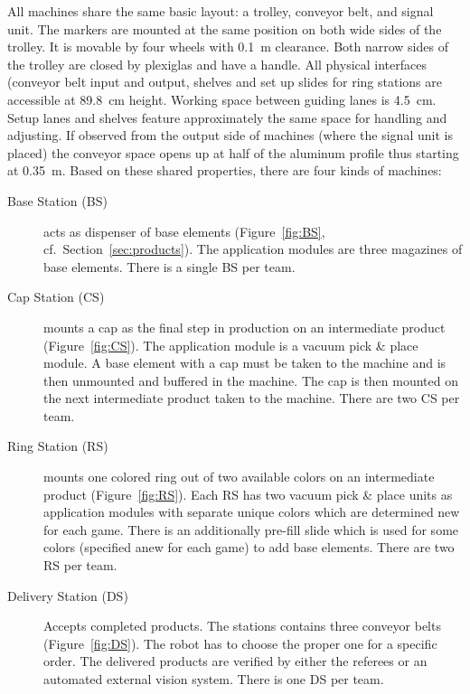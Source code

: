 \documentclass[12pt,twoside]{article}
\newcommand{\refsec}[1]{Section~\ref{#1}}
\newcommand{\reffig}[1]{Figure~\ref{#1}}
\begin{document}
All machines share the same basic layout: a trolley, conveyor belt,
and signal unit. The markers are mounted at the same position on both
wide sides of the trolley. It is movable by four wheels with
\SI{0.1}{\metre} clearance. Both narrow sides of the trolley are
closed by plexiglas and have a handle. All physical interfaces
(conveyor belt input and output, shelves and set up slides for ring
stations are accessible at \SI{89.8}{\centi\metre} height. Working
space between guiding lanes is \SI{4.5}{\centi\metre}. Setup lanes and
shelves feature approximately the same space for handling and
adjusting. If observed from the output side of machines (where the
signal unit is placed) the conveyor space opens up at half of the
aluminum profile
thus starting at \SI{0,35}{\metre}. Based on these shared properties,
there are four kinds of machines:

\begin{description}
\item[Base Station (BS)] acts as dispenser of base elements
  (\reffig{fig:BS}, cf.~\refsec{sec:products}). The application
  modules are three magazines of base elements. There is a single BS
  per team.

\item[Cap Station (CS)] mounts a cap as the final step in production
  on an intermediate product (\reffig{fig:CS}). The application module
  is a vacuum pick \& place module. A base element with a cap must be
  taken to the machine and is then unmounted and buffered in the
  machine. The cap is then mounted on the next intermediate product
  taken to the machine. There are two CS per team.

\item[Ring Station (RS)] mounts one colored ring out of two available
  colors on an intermediate product (\reffig{fig:RS}). Each RS has two
  vacuum pick \& place units as application modules with separate
  unique colors which are determined new for each game. There is an
  additionally pre-fill slide which is used for some colors (specified
  anew for each game) to add base elements. There are two RS per team.

\item[Delivery Station (DS)] Accepts completed products. The stations
  contains three conveyor belts (\reffig{fig:DS}). The robot has to
  choose the proper one for a specific order. The delivered products
  are verified by either the referees or an automated external vision
  system. There is one DS per team.
\end{description}
\end{document}
